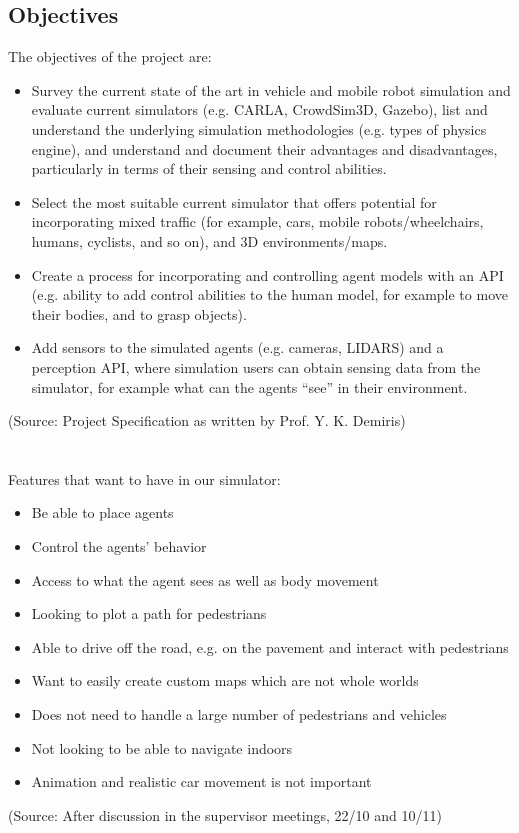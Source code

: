 \subsection{Objectives} \label{Objectives}
The objectives of the project are: 
\begin{itemize}
    \item Survey the current state of the art in vehicle and mobile robot simulation and evaluate current simulators (e.g. CARLA, CrowdSim3D, Gazebo), list and understand the underlying simulation methodologies (e.g. types of physics engine), and understand and document their advantages and disadvantages, particularly in terms of their sensing and control abilities.
    \item Select the most suitable current simulator that offers potential for incorporating mixed traffic (for example, cars, mobile robots/wheelchairs, humans, cyclists, and so on), and 3D environments/maps.
    \item Create a process for incorporating and controlling agent models with an API (e.g. ability to add control abilities to the human model, for example to move their bodies, and to grasp objects).
    \item Add sensors to the simulated agents (e.g. cameras, LIDARS) and a perception API, where simulation users can obtain sensing data from the simulator, for example what can the agents “see” in their environment.
\end{itemize}
(Source: Project Specification as written by Prof. Y. K. Demiris)
\\~\\~\\
Features that want to have in our simulator: 
\begin{itemize}
\item Be able to place agents
\item Control the agents' behavior
\item Access to what the agent sees as well as body movement
\item Looking to plot a path for pedestrians
\item Able to drive off the road, e.g. on the pavement and interact with pedestrians
\item Want to easily create custom maps which are not whole worlds
\item Does not need to handle a large number of pedestrians and vehicles
\item Not looking to be able to navigate indoors
\item Animation and realistic car movement is not important
\end{itemize}
(Source: After discussion in the supervisor meetings, 22/10 and 10/11)
